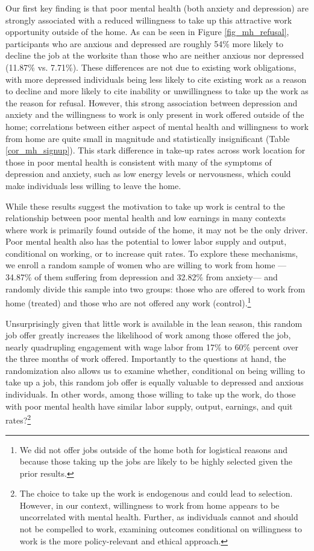 \documentclass[12pt, a4paper, american]{article}
\begin{document}
Our first key finding is that poor mental health (both anxiety and depression) are strongly associated with a reduced willingness to take up this attractive work opportunity outside of the home. As can be seen in Figure \ref{fig_mh_refusal}, participants who are anxious and depressed are roughly 54\% more likely to decline the job at the worksite than those who are neither anxious nor depressed (11.87\% vs. 7.71\%). These differences are not due to existing work obligations, with more depressed individuals being less likely to cite existing work as a reason to decline and more likely to cite inability or unwillingness to take up the work as the reason for refusal. However, this strong association between depression and anxiety and the willingness to work is only present in work offered outside of the home; correlations between either aspect of mental health and willingness to work from home are quite small in magnitude and statistically insignificant (Table \ref{cor_mh_signup}). This stark difference in take-up rates across work location for those in poor mental health is consistent with many of the symptoms of depression and anxiety, such as low energy levels or nervousness, which could make individuals less willing to leave the home. 

While these results suggest the motivation to take up work is central to the relationship between poor mental health and low earnings in many contexts where work is primarily found outside of the home, it may not be the only driver. Poor mental health also has the potential to lower labor supply and output, %
conditional on working, or to increase quit rates. To explore these mechanisms, we enroll a random sample of women who are willing to work from home ---34.87\% of them suffering from depression and 32.82\% from anxiety--- and randomly divide this sample into two groups: those who are offered to work from home (treated) and those who are not offered any work (control).\footnote{We did not offer jobs outside of the home both for logistical reasons and because those taking up the jobs are likely to be highly selected given the prior results.} 

Unsurprisingly given that little work is available in the lean season, this random job offer greatly increases the likelihood of work among those offered the job, nearly quadrupling engagement with wage labor from 17\% to 60\% percent over the three months of work offered. Importantly to the questions at hand, the randomization also allows us to examine whether, conditional on being willing to take up a job, this random job offer is equally valuable to depressed and anxious individuals. In other words, among those willing to take up the work, do those with poor mental health have similar labor supply, output, earnings, and quit rates?\footnote{The choice to take up the work is endogenous and could lead to selection. However, in our context, willingness to work from home appears to be uncorrelated with mental health. Further, as individuals cannot and should not be compelled to work, examining outcomes conditional on willingness to work is the more policy-relevant and ethical approach.} 
\end{document}
